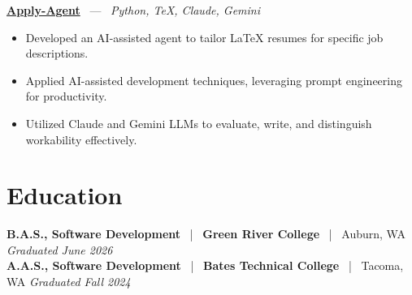 \documentclass[10pt, letterpaper]{article}
\newcommand{\jobhead}[4]{%
  \vspace{5pt}%
  {\bfseries\color{dark}#1}%
  ~{\color{light}|}~%
  {\bfseries\color{navy}#2}%
  ~{\color{light}|}~%
  {\color{light}#3}%
  \hfill{\color{light}\small\textit{#4}}\\[-2pt]%
}
\newcommand{\projhead}[3]{%
  \vspace{5pt}%
  {\bfseries\color{dark}\href{#2}{#1}}%
  ~{\color{light}---}~%
  {\color{light}\small\textit{#3}}\\[-2pt]%
}
\begin{document}
\projhead{Apply-Agent}{https://github.com/timmyd4/apply-agent}{Python, TeX, Claude, Gemini}
\begin{itemize}
  \item Developed an AI-assisted agent to tailor LaTeX resumes for specific job descriptions.
  \item Applied AI-assisted development techniques, leveraging prompt engineering for productivity.
  \item Utilized Claude and Gemini LLMs to evaluate, write, and distinguish workability effectively.
\end{itemize}

\section{Education}

\jobhead{B.A.S., Software Development}{Green River College}{Auburn, WA}{Graduated June 2026}
\jobhead{A.A.S., Software Development}{Bates Technical College}{Tacoma, WA}{Graduated Fall 2024}
\end{document}
